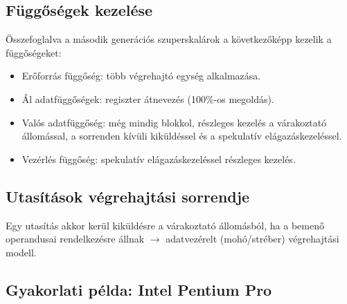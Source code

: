 \subsection{Függőségek kezelése}
Összefoglalva a második generációs szuperskalárok a következőképp kezelik a függőségeket:
\begin{itemize}
    \item Erőforrás függőség: több végrehajtó egység alkalmazása.
    \item Ál adatfüggőségek: regiszter átnevezés (100\%-os megoldás).
    \item Valós adatfüggőség: még mindig blokkol, részleges kezelés a várakoztató állomással, a sorrenden kívüli kiküldéssel és a spekulatív elágazáskezeléssel.
    \item Vezérlés függőség: spekulatív elágazáskezeléssel részleges kezelés.
\end{itemize}

\subsection{Utasítások végrehajtási sorrendje}
Egy utasítás akkor kerül kiküldésre a várakoztató állomásból, ha a bemenő operandusai rendelkezésre állnak $\rightarrow$ adatvezérelt (mohó/stréber) végrehajtási modell.

\subsection{Gyakorlati példa: Intel Pentium Pro}

